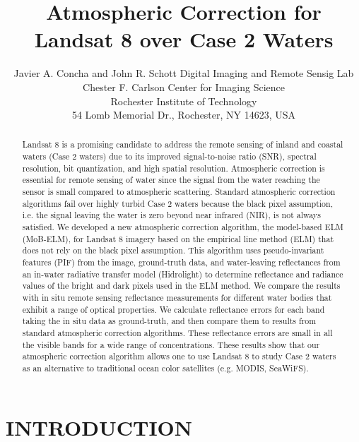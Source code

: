 \documentclass[]{spie}  %
\title{Atmospheric Correction for Landsat 8 over Case 2 Waters}
\author{Javier A. Concha and John R. Schott
\skiplinehalf
Digital Imaging and Remote Sensig Lab\\Chester F. Carlson Center for Imaging Science\\Rochester Institute of Technology\\ 54 Lomb Memorial Dr., Rochester, NY 14623, USA\\
}
\begin{document}
 
  \maketitle 

\begin{abstract}
Landsat 8 is a promising candidate to address the remote sensing of inland and coastal waters (Case 2 waters) due to its improved signal-to-noise ratio (SNR), spectral resolution, bit quantization, and high spatial resolution. Atmospheric correction is essential for remote sensing of water since the signal from the water reaching the sensor is small compared to atmospheric scattering. Standard atmospheric correction algorithms fail over highly turbid Case 2 waters because the black pixel assumption, i.e. the signal leaving the water is zero beyond near infrared (NIR), is not always satisfied. We developed a new atmospheric correction algorithm, the model-based ELM (MoB-ELM), for Landsat 8 imagery based on the empirical line method (ELM) that does not rely on the black pixel assumption. This algorithm uses pseudo-invariant features (PIF) from the image, ground-truth data, and water-leaving reflectances from an in-water radiative transfer model (Hidrolight) to determine reflectance and radiance values of the bright and dark pixels used in the ELM method.  We compare the results with in situ remote sensing reflectance measurements for different water bodies that exhibit a range of optical properties. We calculate reflectance errors for each band taking the in situ data as ground-truth, and then compare them to results from standard atmospheric correction algorithms. These reflectance errors are small in all the visible bands for a wide range of concentrations. These results show that our atmospheric correction algorithm allows one to use Landsat 8 to study Case 2 waters as an alternative to traditional ocean color satellites (e.g. MODIS, SeaWiFS). 
\end{abstract}



\section{INTRODUCTION}
\label{sec:intro}  %
\end{document}
